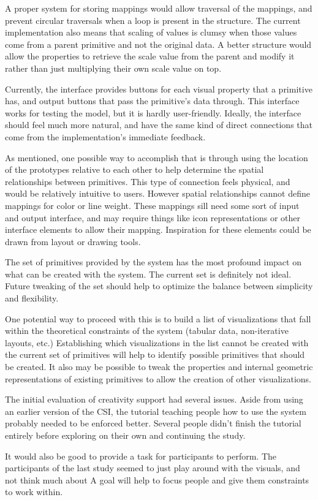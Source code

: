 A proper system for storing mappings would allow traversal of the mappings, and prevent circular traversals when a loop is present in the structure.
The current implementation also means that scaling of values is clumsy when those values come from a parent primitive and not the original data.
A better structure would allow the properties to retrieve the scale value from the parent and modify it rather than just multiplying their own scale value on top.

\label{primConnectionsFW}
Currently, the interface provides buttons for each visual property that a primitive has, and output buttons that pass the primitive's data through.
This interface works for testing the model, but it is hardly user-friendly.
Ideally, the interface should feel much more natural, and have the same kind of direct connections that come from the implementation's immediate feedback.

As mentioned, one possible way to accomplish that is through using the location of the prototypes relative to each other to help determine the spatial relationships between primitives.
This type of connection feels physical, and would be relatively intuitive to users.
However spatial relationships cannot define mappings for color or line weight.
These mappings sill need some sort of input and output interface, and may require things like icon representations or other interface elements to allow their mapping.
Inspiration for these elements could be drawn from layout or drawing tools.

\label{setPrimitivesFW}
The set of primitives provided by the system has the most profound impact on what can be created with the system.
The current set is definitely not ideal.
Future tweaking of the set should help to optimize the balance between simplicity and flexibility.

One potential way to proceed with this is to build a list of visualizations that fall within the theoretical constraints of the system (tabular data, non-iterative layouts, etc.)
Establishing which visualizations in the list cannot be created with the current set of primitives will help to identify possible primitives that should be created.
It also may be possible to tweak the properties and internal geometric representations of existing primitives to allow the creation of other visualizations.

\label{creativitySupportFW}
The initial evaluation of creativity support had several issues.
Aside from using an earlier version of the CSI, the tutorial teaching people how to use the system probably needed to be enforced better.
Several people didn't finish the tutorial entirely before exploring on their own and continuing the study.

It would also be good to provide a task for participants to perform.
The participants of the last study seemed to just play around with the visuals, and not think much about 
A goal will help to focus people and give them constraints to work within.